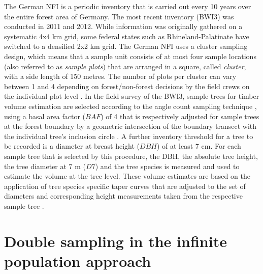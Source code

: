 The German NFI is a periodic inventory that is carried out every 10 years over the entire forest area of Germany. The most recent inventory (BWI3) was conducted in 2011 and 2012. While information was originally gathered on a systematic 4x4 km grid, some federal states such as Rhineland-Palatinate have switched to a densified 2x2 km grid. The German NFI uses a cluster sampling design, which means that a sample unit consists of at most four sample locations (also referred to as \textit{sample plots}) that are arranged in a square, called \textit{cluster}, with a side length of 150 metres. The number of plots per cluster can vary between 1 and 4 depending on forest/non-forest decisions by the field crews on the individual plot level \citep{bwi3_aufn}. In the field survey of the BWI3, sample trees for timber volume estimation are selected according to the angle count sampling technique \citep{bitterlich1984}, using a basal area factor ($BAF$) of 4 that is respectively adjusted for sample trees at the forest boundary by a geometric intersection of the boundary transect with the individual tree's inclusion circle \citep{bwi3_aufn}. A further inventory threshold for a tree to be recorded is a diameter at breast height ($DBH$) of at least 7 cm. For each sample tree that is selected by this procedure, the DBH, the absolute tree height, the tree diameter at 7 m ($D7$) and the tree species is measured and used to estimate the volume at the tree level. These volume estimates are based on the application of tree species specific taper curves that are adjusted to the set of diameters and corresponding height measurements taken from the respective sample tree \citep{kublin2013}.

\section{Double sampling in the infinite population approach}
\label{sec:inf_pop}


